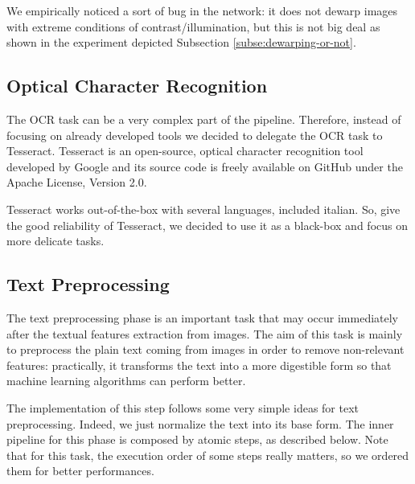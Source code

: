 \documentclass[10pt,twocolumn,letterpaper]{article}
\begin{document}
We empirically noticed a sort of bug in the network: it does not dewarp
images with extreme conditions of contrast/illumination, but this is
not big deal as shown in the experiment depicted Subsection
\ref{subse:dewarping-or-not}.

\subsection{Optical Character Recognition}

The OCR task can be a very complex part of the pipeline. Therefore, instead
of focusing on already developed tools we decided to delegate the OCR
task to Tesseract. Tesseract is an open-source, optical character
recognition tool developed by Google and its source code is freely
available on GitHub under the Apache License, Version 2.0.

Tesseract works out-of-the-box with several languages, included
italian. So, give the good reliability of Tesseract, we decided to use
it as a black-box and focus on more delicate tasks.

\subsection{Text Preprocessing}

The text preprocessing phase is an important task that may occur
immediately after the textual features extraction from images. The aim
of this task is mainly to preprocess the plain text coming from images
in order to remove non-relevant features: practically, it transforms the
text into a more digestible form so that machine learning algorithms
can perform better.

The implementation of this step follows some very simple ideas for
text preprocessing. Indeed, we just normalize the text into its base
form. The inner pipeline for this phase is composed by atomic steps, as
described below. Note that for this task, the execution order of some
steps really matters, so we ordered them for better performances.
\end{document}
